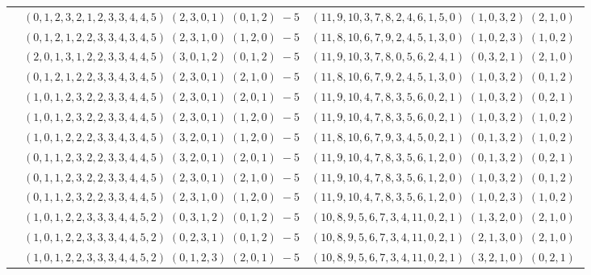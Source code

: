 \documentclass[11pt]{article}
\begin{document}
\begin{longtable}[l]{|c|c|c|}
 \cline{2-3} 
 & $(0 ,1 ,2 ,3 ,2 ,1 ,2 ,3 ,3 ,4 ,4 ,5) \;(2 ,3 ,0 ,1) \;(0 ,1 ,2) \;-5$ & $(11 ,9 ,10 ,3 ,7 ,8 ,2 ,4 ,6 ,1 ,5 ,0) \;(1 ,0 ,3 ,2) \;(2 ,1 ,0) \;$\\ 
 \cline{2-3} 
 & $(0 ,1 ,2 ,1 ,2 ,2 ,3 ,3 ,4 ,3 ,4 ,5) \;(2 ,3 ,1 ,0) \;(1 ,2 ,0) \;-5$ & $(11 ,8 ,10 ,6 ,7 ,9 ,2 ,4 ,5 ,1 ,3 ,0) \;(1 ,0 ,2 ,3) \;(1 ,0 ,2) \;$\\ 
 \cline{2-3} 
 & $(2 ,0 ,1 ,3 ,1 ,2 ,2 ,3 ,3 ,4 ,4 ,5) \;(3 ,0 ,1 ,2) \;(0 ,1 ,2) \;-5$ & $(11 ,9 ,10 ,3 ,7 ,8 ,0 ,5 ,6 ,2 ,4 ,1) \;(0 ,3 ,2 ,1) \;(2 ,1 ,0) \;$\\ 
 \cline{2-3} 
 & $(0 ,1 ,2 ,1 ,2 ,2 ,3 ,3 ,4 ,3 ,4 ,5) \;(2 ,3 ,0 ,1) \;(2 ,1 ,0) \;-5$ & $(11 ,8 ,10 ,6 ,7 ,9 ,2 ,4 ,5 ,1 ,3 ,0) \;(1 ,0 ,3 ,2) \;(0 ,1 ,2) \;$\\ 
 \cline{2-3} 
 & $(1 ,0 ,1 ,2 ,3 ,2 ,2 ,3 ,3 ,4 ,4 ,5) \;(2 ,3 ,0 ,1) \;(2 ,0 ,1) \;-5$ & $(11 ,9 ,10 ,4 ,7 ,8 ,3 ,5 ,6 ,0 ,2 ,1) \;(1 ,0 ,3 ,2) \;(0 ,2 ,1) \;$\\ 
 \cline{2-3} 
 & $(1 ,0 ,1 ,2 ,3 ,2 ,2 ,3 ,3 ,4 ,4 ,5) \;(2 ,3 ,0 ,1) \;(1 ,2 ,0) \;-5$ & $(11 ,9 ,10 ,4 ,7 ,8 ,3 ,5 ,6 ,0 ,2 ,1) \;(1 ,0 ,3 ,2) \;(1 ,0 ,2) \;$\\ 
 \cline{2-3} 
 & $(1 ,0 ,1 ,2 ,2 ,2 ,3 ,3 ,4 ,3 ,4 ,5) \;(3 ,2 ,0 ,1) \;(1 ,2 ,0) \;-5$ & $(11 ,8 ,10 ,6 ,7 ,9 ,3 ,4 ,5 ,0 ,2 ,1) \;(0 ,1 ,3 ,2) \;(1 ,0 ,2) \;$\\ 
 \cline{2-3} 
 & $(0 ,1 ,1 ,2 ,3 ,2 ,2 ,3 ,3 ,4 ,4 ,5) \;(3 ,2 ,0 ,1) \;(2 ,0 ,1) \;-5$ & $(11 ,9 ,10 ,4 ,7 ,8 ,3 ,5 ,6 ,1 ,2 ,0) \;(0 ,1 ,3 ,2) \;(0 ,2 ,1) \;$\\ 
 \cline{2-3} 
 & $(0 ,1 ,1 ,2 ,3 ,2 ,2 ,3 ,3 ,4 ,4 ,5) \;(2 ,3 ,0 ,1) \;(2 ,1 ,0) \;-5$ & $(11 ,9 ,10 ,4 ,7 ,8 ,3 ,5 ,6 ,1 ,2 ,0) \;(1 ,0 ,3 ,2) \;(0 ,1 ,2) \;$\\ 
 \cline{2-3} 
 & $(0 ,1 ,1 ,2 ,3 ,2 ,2 ,3 ,3 ,4 ,4 ,5) \;(2 ,3 ,1 ,0) \;(1 ,2 ,0) \;-5$ & $(11 ,9 ,10 ,4 ,7 ,8 ,3 ,5 ,6 ,1 ,2 ,0) \;(1 ,0 ,2 ,3) \;(1 ,0 ,2) \;$\\ 
 \cline{2-3} 
 & $(1 ,0 ,1 ,2 ,2 ,3 ,3 ,3 ,4 ,4 ,5 ,2) \;(0 ,3 ,1 ,2) \;(0 ,1 ,2) \;-5$ & $(10 ,8 ,9 ,5 ,6 ,7 ,3 ,4 ,11 ,0 ,2 ,1) \;(1 ,3 ,2 ,0) \;(2 ,1 ,0) \;$\\ 
 \cline{2-3} 
 & $(1 ,0 ,1 ,2 ,2 ,3 ,3 ,3 ,4 ,4 ,5 ,2) \;(0 ,2 ,3 ,1) \;(0 ,1 ,2) \;-5$ & $(10 ,8 ,9 ,5 ,6 ,7 ,3 ,4 ,11 ,0 ,2 ,1) \;(2 ,1 ,3 ,0) \;(2 ,1 ,0) \;$\\ 
 \cline{2-3} 
 & $(1 ,0 ,1 ,2 ,2 ,3 ,3 ,3 ,4 ,4 ,5 ,2) \;(0 ,1 ,2 ,3) \;(2 ,0 ,1) \;-5$ & $(10 ,8 ,9 ,5 ,6 ,7 ,3 ,4 ,11 ,0 ,2 ,1) \;(3 ,2 ,1 ,0) \;(0 ,2 ,1) \;$\\ 

\end{longtable}
\end{document}
